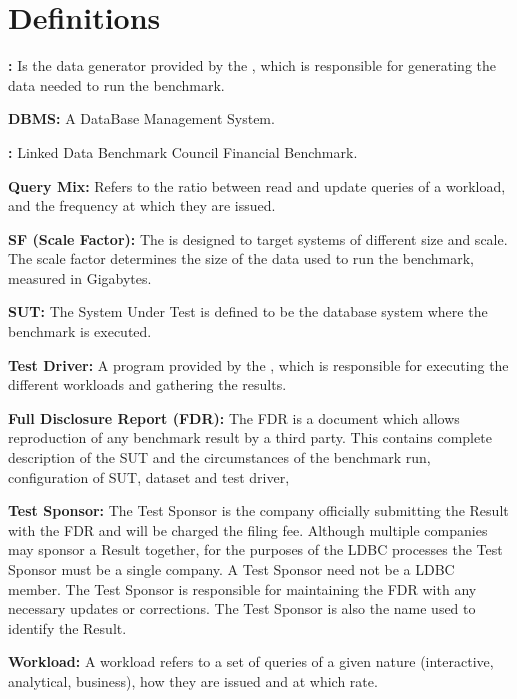\chapter*{Definitions}

{\flushleft \textbf{\datagen:}} Is the data generator provided by the
\ldbcfinbench, which is responsible for generating the data needed to run the
benchmark.

{\flushleft \textbf{DBMS:}} A DataBase Management System. 

{\flushleft \textbf{\ldbcfinbench:}} Linked Data Benchmark Council Financial
Benchmark. 

{\flushleft \textbf{Query Mix:}} Refers to the ratio between read and update
queries of a workload, and the frequency at which they are issued.

{\flushleft \textbf{SF (Scale Factor):}} The \ldbcfinbench is designed to target
systems of different size and scale. The scale factor determines the size of the
data used to run the benchmark, measured in Gigabytes.


{\flushleft \textbf{SUT:}} The System Under Test  is defined to be the database
system where the benchmark is executed.


{\flushleft \textbf{Test Driver:}}  A program provided by the \ldbcfinbench,
which is responsible for executing the different workloads and gathering the
results.

{\flushleft \textbf{Full Disclosure Report (FDR):}} The FDR is a document which
allows reproduction of any benchmark result by a third party. This contains
complete description of the SUT and the circumstances of the benchmark run, \eg
configuration of SUT, dataset and test driver, \etc

{\flushleft \textbf{Test Sponsor:}} The Test Sponsor is the company officially
submitting the Result with the FDR and will be charged the filing fee. Although
multiple companies may sponsor a Result together, for the purposes of the LDBC
processes the Test Sponsor must be a single company. A Test Sponsor need not be
a LDBC member. The Test Sponsor is responsible for maintaining the FDR with any
necessary updates or corrections. The Test Sponsor is also the name used to
identify the Result.

%



{\flushleft \textbf{Workload:}} A workload refers to a set of queries of a given nature
(\ie interactive, analytical, business), how they are issued and at which rate.
